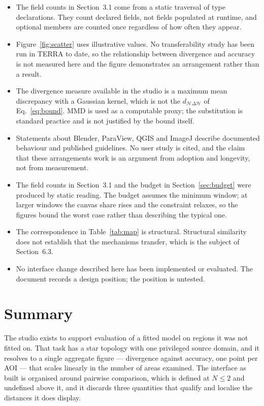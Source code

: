 \documentclass[11pt,a4paper]{article}
\begin{document}
\begin{itemize}
\item The field counts in Section~3.1 come from a static traversal of type
      declarations. They count declared fields, not fields populated at runtime,
      and optional members are counted once regardless of how often they appear.
\item Figure~\ref{fig:scatter} uses illustrative values. No transferability
      study has been run in TERRA to date, so the relationship between
      divergence and accuracy is not measured here and the figure demonstrates
      an arrangement rather than a result.
\item The divergence measure available in the studio is a maximum mean
      discrepancy with a Gaussian kernel, which is not the
      $d_{\mathcal{H}\Delta\mathcal{H}}$ of Eq.~\eqref{eq:bound}. MMD is used as
      a computable proxy; the substitution is standard practice and is not
      justified by the bound itself.
\item Statements about Blender, ParaView, QGIS and ImageJ describe documented
      behaviour and published guidelines. No user study is cited, and the claim
      that these arrangements work is an argument from adoption and longevity,
      not from measurement.
\item The field counts in Section~3.1 and the budget in Section~\ref{sec:budget}
      were produced by static reading. The budget assumes the minimum window;
      at larger windows the canvas share rises and the constraint relaxes, so
      the figures bound the worst case rather than describing the typical one.
\item The correspondence in Table~\ref{tab:map} is structural. Structural
      similarity does not establish that the mechanisms transfer, which is the
      subject of Section~6.3.
\item No interface change described here has been implemented or evaluated. The
      document records a design position; the position is untested.
\end{itemize}

\section{Summary}

The studio exists to support evaluation of a fitted model on regions it was not
fitted on. That task has a star topology with one privileged source domain, and
it resolves to a single aggregate figure --- divergence against accuracy, one
point per AOI --- that scales linearly in the number of areas examined. The
interface as built is organised around pairwise comparison, which is defined at
$N \le 2$ and undefined above it, and it discards three quantities that qualify
and localise the distances it does display.
\end{document}
